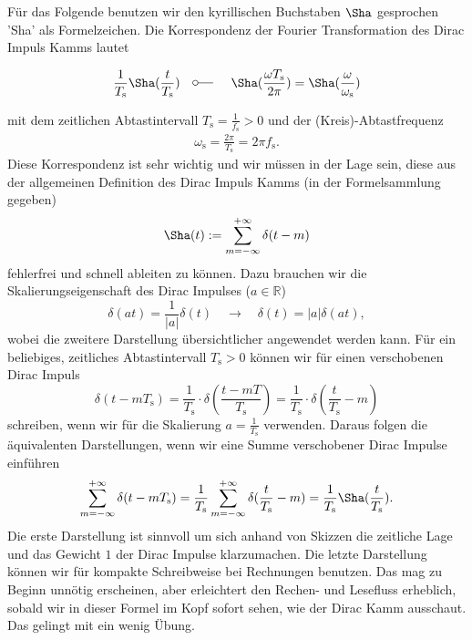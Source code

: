 Für das Folgende benutzen wir den kyrillischen Buchstaben $\Sha$ gesprochen
'Sha' als Formelzeichen.
%
Die Korrespondenz der Fourier Transformation des Dirac Impuls Kamms lautet
\begin{mdframed}
\begin{equation}
\frac{1}{T_\mathrm{s}} {\Sha}(\frac{t}{T_\mathrm{s}}) \quad\fourier\quad
{\Sha}(\frac{\omega T_\mathrm{s}}{2 \pi}) =
\Sha(\frac{\omega}{\omega_\mathrm{s}})
\end{equation}
\end{mdframed}
mit dem zeitlichen Abtastintervall $T_\mathrm{s} = \frac{1}{f_\mathrm{s}}>0$
und der (Kreis)-Abtastfrequenz
\begin{align}
\omega_\mathrm{s} = \frac{2 \pi}{T_\mathrm{s}}  = 2 \pi f_\mathrm{s}.
\end{align}
%
Diese Korrespondenz ist sehr wichtig und wir müssen in der Lage sein, diese
aus der allgemeinen Definition des Dirac Impuls Kamms (in der Formelsammlung gegeben)
\begin{equation}
{\Sha}(t) := \sum_{m=-\infty}^{+\infty} \delta(t-m)%
\end{equation}
fehlerfrei und schnell ableiten zu können.
%
Dazu brauchen wir die Skalierungseigenschaft des Dirac Impulses ($a\in\mathbb{R}$)
\begin{equation}
\delta(a t) = \frac{1}{|a|} \delta(t) \quad\longrightarrow\quad
\delta(t) = |a| \delta(a t),
\end{equation}
wobei die zweitere Darstellung übersichtlicher angewendet werden kann.
%
Für ein beliebiges, zeitliches Abtastintervall $T_\mathrm{s}>0$ können wir
für einen verschobenen Dirac Impuls
\begin{equation}
\delta(t - m T_\mathrm{s}) =
\frac{1}{T_\mathrm{s}}\cdot \delta(\frac{t - m T}{T_\mathrm{s}}) =
\frac{1}{T_\mathrm{s}} \cdot \delta(\frac{t}{T_\mathrm{s}}-m)
\end{equation}
schreiben, wenn wir für die Skalierung $a=\frac{1}{T_\mathrm{s}}$ verwenden.
%
Daraus folgen die äquivalenten Darstellungen, wenn wir eine Summe
verschobener Dirac Impulse einführen
\begin{equation}
\sum_{m=-\infty}^{+\infty} \delta(t-m T_\mathrm{s}) =
\frac{1}{T_\mathrm{s}}\sum_{m=-\infty}^{+\infty} \delta(\frac{t}{T_\mathrm{s}}-m) =
\frac{1}{T_\mathrm{s}} {\Sha}(\frac{t}{T_\mathrm{s}}).
\end{equation}
Die erste Darstellung ist sinnvoll um sich anhand von Skizzen die zeitliche
Lage und das Gewicht $1$ der Dirac Impulse klarzumachen. Die letzte
Darstellung können wir für kompakte Schreibweise bei Rechnungen benutzen. Das
mag zu Beginn unnötig erscheinen, aber erleichtert den Rechen- und Lesefluss
erheblich, sobald wir in dieser Formel im Kopf sofort sehen, wie der Dirac Kamm
ausschaut. Das gelingt mit ein wenig Übung.

